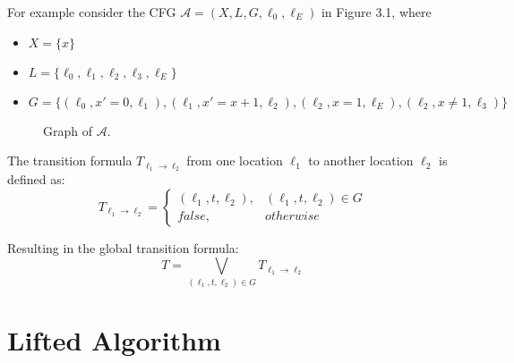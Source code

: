 \documentclass[11pt, a4paper, BCOR=10mm, ngerman]{scrbook}
\begin{document}
For example consider the CFG $\mathcal{A} = (X, L, G, \ell_0, \ell_E)$ in Figure 3.1, where
\begin{itemize}
\item $X = \{x\}$
\item $L = \{\ell_0, \ell_1, \ell_2, \ell_3, \ell_E\}$
\item $G = \{(\ell_0, x' = 0, \ell_1), (\ell_1, x' = x + 1, \ell_2), (\ell_2, x = 1, \ell_E), (\ell_2, x \neq 1, \ell_3) \} $
\end{itemize}
\pagebreak

\begin{figure}[H]
\centering
{}
  \caption{Graph of $\mathcal{A}$.}
 \end{figure}
 \label{ex7} 

The transition formula $T_{\ell_1 \rightarrow \ell_2}$ from one location $\ell_1$ to another location $\ell_2$ is defined as:
\begin{equation*}
T_{\ell_1 \rightarrow \ell_2} = \begin{cases} (\ell_1, t, \ell_2), & (\ell_1, t, \ell_2) \in G \\
                     false, & otherwise
       \end{cases}
\end{equation*}

Resulting in the global transition formula: \\
$$ T = \bigvee_{(\ell_1, t, \ell_2) \in G} T_{\ell_1 \rightarrow \ell_2}$$

\section{Lifted Algorithm}
\end{document}

